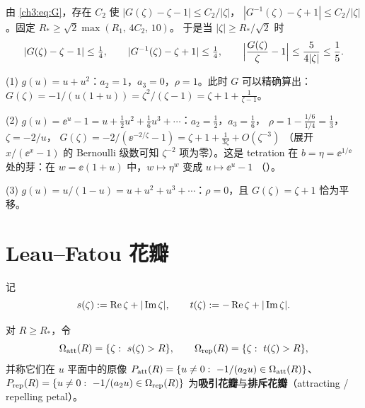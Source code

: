 由 \eqref{ch3:eq:G}，存在 $C_2$ 使 $|G(\zeta)-\zeta-1|\le C_2/|\zeta|$，
$|G^{-1}(\zeta)-\zeta+1|\le C_2/|\zeta|$。固定 $R_*\ge\sqrt2\max(R_1,\,4C_2,\,10)$。
于是当 $|\zeta|\ge R_*/\sqrt2$ 时
\begin{equation}\label{ch3:eq:quarter}
 |G(\zeta)-\zeta-1|\le\tfrac14,\qquad |G^{-1}(\zeta)-\zeta+1|\le\tfrac14,\qquad
 \Bigl|\frac{G(\zeta)}{\zeta}-1\Bigr|\le\frac{5}{4|\zeta|}\le\frac{1}{5}.
\end{equation}

\begin{example}\label{ch3:ex:zeta}
(1) $g(u)=u+u^2$：$a_2=1$，$a_3=0$，$\rho=1$。此时 $G$ 可以精确算出：
$G(\zeta)=-1/(u(1+u))=\zeta^2/(\zeta-1)=\zeta+1+\frac{1}{\zeta-1}$。

(2) $g(u)=\ee^u-1=u+\tfrac12u^2+\tfrac16u^3+\cdots$：$a_2=\tfrac12$，$a_3=\tfrac16$，
$\rho=1-\tfrac{1/6}{1/4}=\tfrac13$，$\zeta=-2/u$，
$G(\zeta)=-2/(\ee^{-2/\zeta}-1)=\zeta+1+\frac{1}{3\zeta}+O(\zeta^{-3})$
（展开 $x/(\ee^x-1)$ 的 Bernoulli 级数可知 $\zeta^{-2}$ 项为零）。这是 tetration 在
$b=\eta=\ee^{1/\ee}$ 处的芽：在 $w=\ee(1+u)$ 中，$w\mapsto\eta^w$ 变成 $u\mapsto\ee^u-1$
（\cite[\S2.1]{KneserPaper}）。

(3) $g(u)=u/(1-u)=u+u^2+u^3+\cdots$：$\rho=0$，且 $G(\zeta)=\zeta+1$ 恰为平移。
\end{example}

\section{Leau--Fatou 花瓣}\label{ch3:sec:petals}

记
\[
 s(\zeta):=\operatorname{Re}\zeta+|\operatorname{Im}\zeta|,\qquad t(\zeta):=-\operatorname{Re}\zeta+|\operatorname{Im}\zeta| .
\]

\begin{definition}[花瓣]\label{ch3:def:petals}
对 $R\ge R_*$，令
\[
 \Omega_{\mathrm{att}}(R)=\{\zeta:\ s(\zeta)>R\},\qquad \Omega_{\mathrm{rep}}(R)=\{\zeta:\ t(\zeta)>R\},
\]
并称它们在 $u$ 平面中的原像
$\Patt(R)=\{u\ne0:\ -1/(a_2u)\in\Oatt(R)\}$、
$P_{\mathrm{rep}}(R)=\{u\ne0:\ -1/(a_2u)\in\Omega_{\mathrm{rep}}(R)\}$
为\textbf{吸引花瓣}与\textbf{排斥花瓣}（attracting / repelling petal）。
\end{definition}

